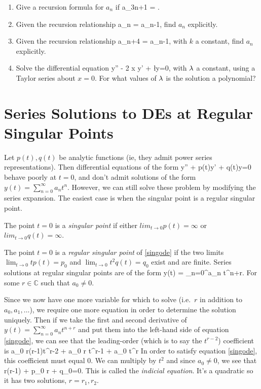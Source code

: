 \documentclass[12pt]{article}
\begin{document}
\begin{enumerate}
  \item
    Give a recursion formula for $a_n$ if 
    \be
    a_{3n+1} = .
    \ee

  \item
    Given the recursion relationship
    \be
    a_n = a_{n-1},
    \ee
    find $a_n$ explicitly.

  \item
    Given the recursion relationship
    \be
    a_{n+4} =  a_{n-1},
    \ee
    with $k$ a constant, find $a_n$ explicitly.

  \item Solve the differential equation
    \be
    y'' - 2 x y' + \l y=0,
    \ee
    with $\lambda$ a constant, using a Taylor series about $x=0$. For what values
    of $\lambda$ is the solution a polynomial?

\end{enumerate}
      

\newpage
\section{Series Solutions to DEs at Regular Singular Points}
Let $p(t), q(t)$ be analytic functions (ie, they admit power series representations). Then differential equations of the form
\be
\label{singode}
y'' + p(t)y' + q(t)y=0
\ee
behave poorly at $t=0$, and don't admit solutions of the form
$y(t) =\sum_{n=0}^\infty a_n t^n$. However, we can still solve these problem
by modifying the series expansion. The easiest case is when the singular
point is a regular singular point.

The point $t=0$ is a \emph{singular point} if either 
$lim_{t \rightarrow 0}p(t)=\infty$ or  $lim_{t \rightarrow 0}q(t)=\infty$.

The point $t=0$ is a \emph{regular singular point} of \eqref{singode} if
the two limits $\lim_{t\rightarrow 0} t p(t) =p_0$ 
and $\lim_{t\rightarrow 0} t^2 q(t) =q_0$
exist and are finite. Series solutions at regular singular points are of the
form
\be
y(t) = \sum_{n=0}^\infty a_n t^{n+r}.
\ee
For some $r\in\mathbb{C}$ such that $a_0 \neq 0$. 

Since we now have one more variable for which to solve (i.e.\ $r$ in addition
to $a_0, a_1,\dots$), we require one more equation in order to determine the
solution uniquely. Then if we take the first and second derivative of $y(t) = \sum_{n=0}^\infty a_n t^{n+r}$ and put them into the left-hand side of equation \eqref{singode}, we can see that the 
leading-order (which is to say the $t^{r-2}$) coefficient is 
\be
a_0 r(r-1)t^{r-2} + a_0  r t^{r-1} + a_0  t^r 
\ee
In order to satisfy equation \eqref{singode}, this coefficient must equal $0$. We can multiply by $t^2$ and since $a_0 \neq 0$, we see that
\be
\implies r(r-1) + p_0 r  + q_0=0.
\ee
This is called the \emph{indicial equation}. It's a quadratic so it has two solutions, $r=r_1,r_2$.
\end{document}

